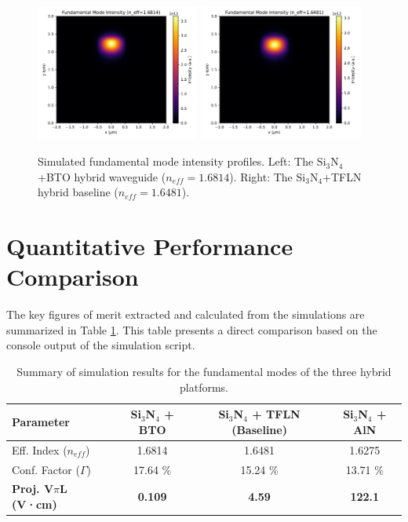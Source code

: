\documentclass[12pt, a4paper, numbers]{report}
\begin{document}
\begin{figure}[htbp]
    \centering
    \includegraphics[width=0.48\textwidth]{simulation_intensity_BTO.pdf}
    \includegraphics[width=0.48\textwidth]{simulation_intensity_TFLN.pdf}
    \caption{Simulated fundamental mode intensity profiles. Left: The Si$_3$N$_4$+BTO hybrid waveguide ($n_{eff}=1.6814$). Right: The Si$_3$N$_4$+TFLN hybrid baseline ($n_{eff}=1.6481$).}
    \label{fig:profiles}
\end{figure}

\section{Quantitative Performance Comparison}
The key figures of merit extracted and calculated from the simulations are summarized in Table \ref{tab:results}. This table presents a direct comparison based on the console output of the simulation script.

\begin{table}[htbp]
\caption{Summary of simulation results for the fundamental modes of the three hybrid platforms.}
\label{tab:results}
\centering
\begin{tabular}{lccc}
\toprule
\textbf{Parameter} & \textbf{Si$_3$N$_4$ + BTO} & \textbf{Si$_3$N$_4$ + TFLN (Baseline)} & \textbf{Si$_3$N$_4$ + AlN} \\
\midrule
Eff. Index ($n_{eff}$) & 1.6814 & 1.6481 & 1.6275 \\
Conf. Factor ($\Gamma$) & 17.64 \% & 15.24 \% & 13.71 \% \\
\textbf{Proj. V$\pi$L (V·cm)} & \textbf{0.109} & \textbf{4.59} & \textbf{122.1} \\
\bottomrule
\end{tabular}
\end{table}
\end{document}
